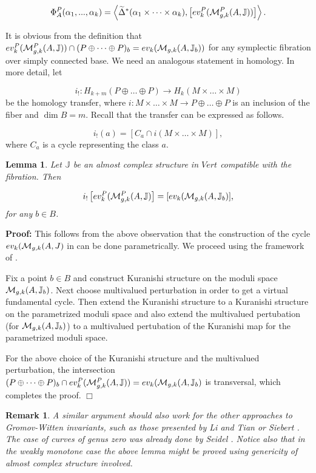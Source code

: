 \documentclass[a4paper,14pt]{article}
\newcommand{\B}[1]{\mathbb #1}
\newcommand{\C}[1]{{\cal #1}}
\newcommand{\al}{{\alpha}}
\newcommand{\De}{{\Delta}}
\newcommand{\pf}{\NI {\bf Proof: }}
\newcommand{\moplus}{\oplus \dots \oplus}
\newcommand{\QED}{\hfill$\Box$\medskip}
\newcommand{\NI}{{\noindent}}
\newtheorem{rem}[theorem]{Remark}
\newtheorem{lemma}[theorem]{Lemma}
\numberwithin{equation}{section}
\begin{document}
$$\Phi^P _A (\al_1,...,\al_k) = 
\left <\widetilde {\De }^*(\al_1\times \dots\times \al_k) , 
\left [ev_k^P(\C M^P_{g,k}(A,\B J))\right ]\right >.$$


It is obvious from the definition that
$ev_k^P(\C M_{g,k}^P(A,\B J))\cap (P\oplus \dots \oplus P)_b 
=ev_k(\C M_{g,k}(A,\B J_b))$ for any symplectic fibration over
simply connected base. We need an analogous statement in
homology. In more detail, let 

$$
i_!:H_{k+m}(P\oplus \dots \oplus P)\to H_k(M\times \dots \times M)
$$
be the homology transfer, where 
$i:M\times \dots \times M \to P\oplus \dots \oplus P$ is an inclusion
of the fiber and $\dim B=m$. Recall that the transfer can be 
expressed as follows.

$$
i_!(a)= [C_a \cap i(M\times \dots \times M)],
$$
where $C_a$ is a cycle representing the class $a$.



\begin{lemma}\label{L:main}
Let $\B J$ be an almost complex structure in $Vert$
compatible with the fibration.
Then  

$$
i_! \left [ev^P_k(\C M^P_{g,k}(A,\B J)\right ] = 
[ev_k(\C M_{g,k}(A,\B J_b)],$$
for any $b\in B$.

\end{lemma}

\pf
This follows from the above observation that the construction of
the cycle  $ev_k (\C M_{g,k}(A,J)$ in \cite{fo} can
be done parametrically. 
We proceed using the framework of \cite{fo}.

Fix a point $b\in B$ and construct Kuranishi structure
on the moduli space 
$\C M_{g,k}(A,\B J_b)$. 
Next choose
multivalued perturbation in order to get a virtual
fundamental cycle. Then extend the Kuranishi structure to
a Kuranishi structure on the parametrized moduli space
and also extend the multivalued pertubation (for
$\C M_{g,k}(A,\B J_b)$)  to a multivalued pertubation
of the Kuranishi map for the parametrized moduli space.

For the above choice of the Kuranishi structure and
the multivalued perturbation, the intersection 
$(P\moplus P)_b\cap ev^P_k(\C M^P_{g,k}(A,\B J))= 
ev_k(\C M_{g,k}(A,\B J_b)$ is transversal, which
completes the proof.
\QED


\begin{rem}\label{R:main}
{\em
A similar argument should also work for the other approaches
to Gromov-Witten invariants, such as those presented by
Li and Tian \cite{lt} or Siebert \cite{si}. 
The case of curves of genus zero was
already done by Seidel \cite{se}. Notice also that in the
weakly monotone case the above lemma might be proved using
genericity of almost complex structure involved.}
\end{rem}
\end{document}
